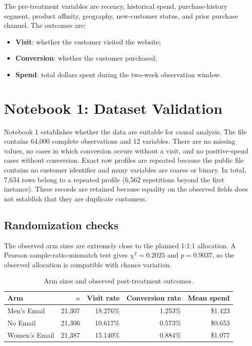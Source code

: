 \documentclass[11pt]{article}
\newcommand{\emailM}{Men's Email}
\newcommand{\emailW}{Women's Email}
\newcommand{\control}{No Email}
\begin{document}
The pre-treatment variables are recency, historical spend, purchase-history segment, product affinity, geography, new-customer status, and prior purchase channel. The outcomes are:
\begin{itemize}
    \item \textbf{Visit}: whether the customer visited the website;
    \item \textbf{Conversion}: whether the customer purchased;
    \item \textbf{Spend}: total dollars spent during the two-week observation window.
\end{itemize}

\section{Notebook 1: Dataset Validation}

Notebook 1 establishes whether the data are suitable for causal analysis. The file contains 64,000 complete observations and 12 variables. There are no missing values, no cases in which conversion occurs without a visit, and no positive-spend cases without conversion. Exact row profiles are repeated because the public file contains no customer identifier and many variables are coarse or binary. In total, 7,634 rows belong to a repeated profile (6,562 repetitions beyond the first instance). These records are retained because equality on the observed fields does not establish that they are duplicate customers.

\subsection{Randomization checks}

The observed arm sizes are extremely close to the planned 1:1:1 allocation. A Pearson sample-ratio-mismatch test gives $\chi^2=0.2025$ and $p=0.9037$, so the observed allocation is compatible with chance variation.

\begin{table}[H]
\centering
\caption{Arm sizes and observed post-treatment outcomes.}
\label{tab:arm-summary}
\begin{tabular}{lrrrr}
\toprule
Arm & $n$ & Visit rate & Conversion rate & Mean spend \\
\midrule
\emailM & 21,307 & 18.276\% & 1.253\% & \$1.423 \\
\control & 21,306 & 10.617\% & 0.573\% & \$0.653 \\
\emailW & 21,387 & 15.140\% & 0.884\% & \$1.077 \\
\bottomrule
\end{tabular}
\end{table}
\end{document}
